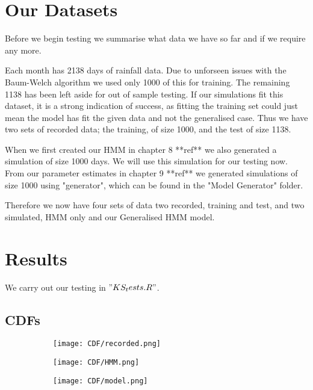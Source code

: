 
\section{Our Datasets}

Before we begin testing we summarise what data we have so far and if we require any more. 

Each month has 2138 days of rainfall data. Due to unforseen issues with the Baum-Welch algorithm we used only 1000 of this for training. The remaining 1138 has been left aside for out of sample testing. If our simulations fit this dataset, it is a strong indication of success, as fitting the training set could just mean the model has fit the given data and not the generalised case. Thus we have two sets of recorded data; the training, of size 1000, and the test of size 1138.

When we first created our HMM in chapter 8 **ref** we also generated a simulation of size 1000 days. We will use this simulation for our testing now. From our parameter estimates in chapter 9 **ref** we generated simulations of size 1000 using "generator", which can be found in the "Model Generator" folder. 

Therefore we now have four sets of data two recorded, training and test,  and two simulated, HMM only and our Generalised HMM model.

\section{Results}

We carry out our testing in $"KS_tests.R"$.




\subsection{CDFs}

\begin{figure}
    \begin{subfigure}{.3\textwidth}
      \centering
      \texttt{[image: CDF/recorded.png]}
      \caption{}
      \label{CDF:data}
    \end{subfigure}
    \begin{subfigure}{.3\textwidth}
      \centering
      \texttt{[image: CDF/HMM.png]}
      \caption{}
      \label{CDF:simhmm}
    \end{subfigure}
    \begin{subfigure}{.3\textwidth}
      \centering
      \texttt{[image: CDF/model.png]}
      \caption{}
      \label{CDF:model}
    \end{subfigure}
    \caption{}
    \label{CDF}
\end{figure}

